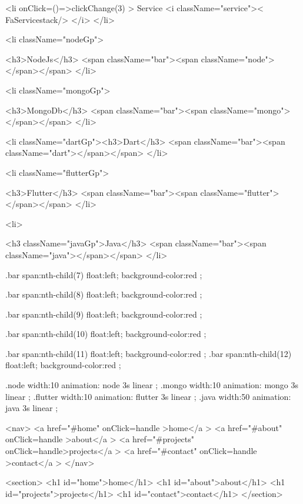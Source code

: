 <li  onClick={()=>clickChange(3)} > Service <i className="service">< FaServicestack/>     </i>   </li>



<li className="nodeGp">
  
  <h3>NodeJs</h3>
<span className="bar"><span className="node"></span></span>
</li>



<li className="mongoGp">
  
  <h3>MongoDb</h3>
<span className="bar"><span className="mongo"></span></span>
</li>


<li className="dartGp"><h3>Dart</h3>
<span className="bar"><span className="dart"></span></span>
</li>


<li className="flutterGp">
  
  <h3>Flutter</h3>
<span className="bar"><span className="flutter"></span></span>
</li>



<li>
  
  <h3 className="javaGp">Java</h3>
<span className="bar"><span className="java"></span></span>
</li>



.bar span:nth-child(7){
    float:left;
    background-color:red ;
}

.bar span:nth-child(8){
    float:left;
    background-color:red ;
}


.bar span:nth-child(9){
    float:left;
    background-color:red ;
}


.bar span:nth-child(10){
    float:left;
    background-color:red ;
}

.bar span:nth-child(11){
    float:left;
    background-color:red ;
}
.bar span:nth-child(12){
    float:left;
    background-color:red ;
}


.node{
    width:10%
    animation: node 3s linear ;
}
.mongo{
    width:10%
    animation: mongo 3s linear ;
}
.flutter{
    width:10%
    animation: flutter 3s linear ;
}
.java{
    width:50%
    animation: java 3s linear ;
}







<nav>
  <a href="#home"   onClick={handle} >home</a  >
  <a  href="#about"    onClick={handle} >about</a  >
  <a href="#projects"    onClick={handle}>projects</a  >
  <a  href="#contact"  onClick={handle} >contact</a  >
</nav>
  
  <section>
    <h1 id="home">home</h1>
    <h1 id="about">about</h1>
    <h1 id="projects">projects</h1>
    <h1 id="contact">contact</h1>
  </section>


